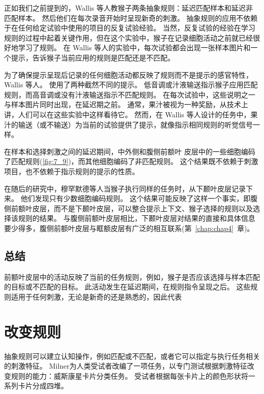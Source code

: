 正如我们之前提到的，Wallis 等人\cite{wallis2001single}教猴子两条抽象规则：延迟匹配样本和延迟非匹配样本。 
然后他们在每次录音开始时呈现新奇的刺激。 抽象规则的应用不依赖于在任何给定试验中使用的项目的反复试验经验。 
当然，反复试验的经验在学习规则的过程中起着关键作用，但在这个实验中，猴子在记录细胞活动之前就已经很好地学习了规则。 
在 Wallis 等人的实验中，每次试验都会出现一张样本图片和一个提示，告诉猴子当前应用的规则是匹配还是不匹配。
\par


为了确保提示呈现后记录的任何细胞活动都反映了规则而不是提示的感官特性，Wallis 等人。
使用了两种截然不同的提示。
低音调或汁液输送指示猴子应用匹配规则，而高音调或没有汁液输送指示不匹配规则。
在每次试验中，这些说明之一与样本图片同时出现，在延迟期之前。 
通常，果汁被视为一种奖励，从技术上讲，人们可以在这些实验中这样看待它。
然而，在 Wallis 等人设计的任务中，果汁的输送（或不输送）为当前的试验提供了提示，就像指示相同规则的听觉信号一样。
\par


在样本和选择刺激之间的延迟期间，中外侧和腹侧前额叶 皮层中的一些细胞编码了匹配规则(\ref{fig:7_9})，而其他细胞编码了非匹配规则。 
这个结果既不依赖于刺激项目，也不依赖于指示规则的提示的性质\cite{wallis2001single}。
\par


在随后的研究中，穆罕默德等人\cite{muhammad2006comparison}当猴子执行同样的任务时，从下颞叶皮层记录下来。 
他们发现只有少数细胞编码规则。
这个结果可能反映了这样一个事实，即腹侧前额叶皮层，而不是下颞叶皮层，可以整合提示上下文、猴子选择的规则以及选择该规则的结果。
与腹侧前额叶皮层相比，下颞叶皮层对结果的直接和具体信息要少得多，腹侧前额叶皮层与眶额皮层有广泛的相互联系(第~\ref{chap:chap4}~章)。



\subsection{总结}
\par
前额叶皮层中的活动反映了当前的任务规则，例如，猴子是否应该选择与样本匹配的目标或不匹配的目标。
此活动发生在延迟期间，在规则指令呈现之后。
这些规则适用于任何刺激，无论是新奇的还是熟悉的，因此代表



\section{改变规则}
\par
抽象规则可以建立认知操作，例如匹配或不匹配，或者它可以指定与执行任务相关的刺激特征。 
Milner\cite{milner1963effects}为人类受试者改编了一项任务，以专门测试根据刺激特征改变规则的能力：威斯康星卡片分类任务。 
受试者根据每张卡片上的颜色形状将一系列卡片分成四堆。
\par


